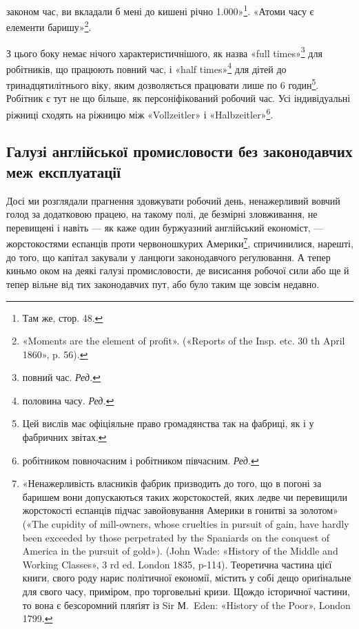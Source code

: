 \parcont{}  %
законом час, ви вкладали б мені до кишені річно \num{1.000}»\footnote{
Там же, стор. 48.
}. «Атоми часу є елементи баришу»\footnote{
«Moments are the element of profit». («Reports of the Insp. etc.
30 th April 1860», p. 56).
}.

З цього боку немає нічого характеристичнішого, як назва
«\textenglish{full times}»\footnote*{
повний час. \emph{Ред.}
} для робітників, що працюють повний час, і «half
times»\footnote*{
половина часу. \emph{Ред.}
} для дітей до тринадцятилітнього віку, яким дозволяється
працювати лише по 6 годин\footnote{
Цей вислів має офіціяльне право громадянства так на фабриці,
як і у фабричних звітах.
}. Робітник є тут не що більше,
як персоніфікований робочий час. Усі індивідуальні ріжниці
сходять на ріжницю між «Vollzeitler» і «Halbzeitler»\footnote*{
робітником повночасним і робітником півчасним. \emph{Ред.}
}.

\subsection{Галузі англійської промисловости без законодавчих меж
експлуатації}

Досі ми розглядали прагнення здовжувати робочий день,
ненажерливий вовчий голод за додатковою працею, на такому
полі, де безмірні зловживання, не перевищені і навіть — як каже
один буржуазний англійський економіст, — жорстокостями еспанців
проти червоношкурих Америки\footnote{
«Ненажерливість власників фабрик призводить до того, що в погоні
за баришем вони допускаються таких жорстокостей, яких ледве чи
перевищили жорстокості еспанців підчас завойовування Америки в гонитві
за золотом» («The cupidity of mill-owners, whose cruelties in pursuit
of gain, have hardly been exceeded by those perpetrated by the Spaniards
on the conquest of America in the pursuit of gold»). (John Wade:
«History of the Middle and Working Classes», 3 rd ed. London 1835, p-114).
Теоретична частина цієї книги, свого роду нарис політичної економії,
містить у собі дещо ориґінальне для свого часу, приміром, про торговельні
кризи. Щождо історичної частини, то вона є безсоромний пляґіят із Sir
М.~Eden: «History of the Poor», London 1799.
}, спричинилися, нарешті,
до того, що капітал закували у ланцюги законодавчого реґулювання.
А тепер киньмо оком на деякі галузі промисловости, де
висисання робочої сили або ще й тепер вільне від тих законодавчих
пут, або було таким ще зовсім недавно.

